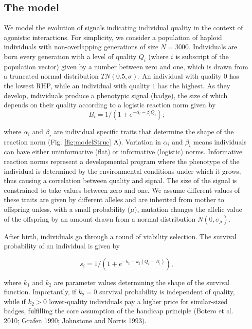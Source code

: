 \documentclass[
  12pt,
]{article}
\begin{document}
\hypertarget{the-model}{%
\subsection{The model}\label{the-model}}

We model the evolution of signals indicating individual quality in the
context of agonistic interactions. For simplicity, we consider a
population of haploid individuals with non-overlapping generations of
size \(N=3000\). Individuals are born every generation with a level of
quality \(Q_i\) (where \(i\) is subscript of the population vector)
given by a number between zero and one, which is drawn from a truncated
normal distribution \(TN( 0.5,\sigma)\). An individual with quality
\(0\) has the lowest RHP, while an individual with quality \(1\) has the
highest. As they develop, individuals produce a phenotypic signal
(badge), the size of which depends on their quality according to a
logistic reaction norm given by \begin{equation}
B_i=1/(1+e^{-\alpha_i-\beta_i Q_i}) \textrm{;}\label{eq:reacNorm}
\end{equation}

where \(\alpha_i\) and \(\beta_i\) are individual specific traits that
determine the shape of the reaction norm (Fig. \ref{fig:modelStruc} A).
Variation in \(\alpha_i\) and \(\beta_i\) means individuals can have
either uninformative (flat) or informative (logistic) norms. Informative
reaction norms represent a developmental program where the phenotype of
the individual is determined by the environmental conditions under which
it grows, thus causing a correlation between quality and signal. The
size of the signal is constrained to take values between zero and one.
We assume different values of these traits are given by different
alleles and are inherited from mother to offspring unless, with a small
probability (\(\mu\)), mutation changes the allelic value of the
offspring by an amount drawn from a normal distribution
\(N(0,\sigma_\mu)\).

After birth, individuals go through a round of viability selection. The
survival probability of an individual is given by

\begin{equation}
s_i=1/(1+e^{-k_1-k_2(Q_i-B_i)})\textrm{,} \label{eq:viability}
\end{equation}

where \(k_1\) and \(k_2\) are parameter values determining the shape of
the survival function. Importantly, if \(k_2=0\) survival probability is
independent of quality, while if \(k_2>0\) lower-quality individuals pay
a higher price for similar-sized badges, fulfilling the core assumption
of the handicap principle (Botero et al. 2010; Grafen 1990; Johnstone
and Norris 1993).
\end{document}
